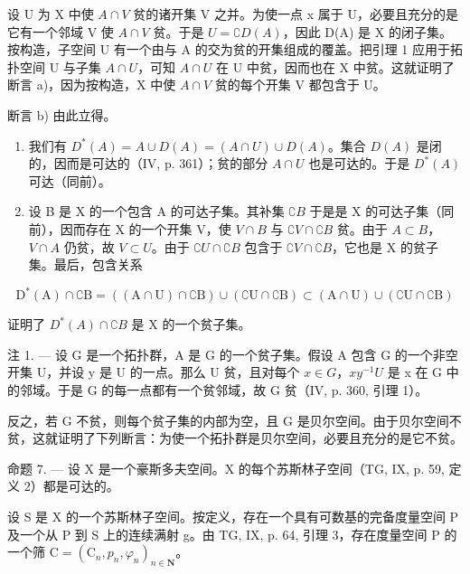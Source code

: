 设 U 为 X 中使 \(A \cap V\) 贫的诸开集 V 之并。为使一点 x 属于 U，必要且充分的是它有一个邻域 V 使 \(A \cap V\) 贫。于是 \(U = \complement D(A)\)，因此 D(A) 是 X 的闭子集。按构造，子空间 U 有一个由与 A 的交为贫的开集组成的覆盖。把引理 1 应用于拓扑空间 U 与子集 \(A \cap U\)，可知 \(A \cap U\) 在 U 中贫，因而也在 X 中贫。这就证明了断言 a)，因为按构造，X 中使 \(A \cap V\) 贫的每个开集 V 都包含于 U。

断言 b) 由此立得。

\begin{enumerate}
\def\labelenumi{\alph{enumi})}
\setcounter{enumi}{2}
\item
  我们有 \(D^{*}(A) = A \cup D(A) = (A \cap U) \cup D(A)\)。集合 \(D(A)\) 是闭的，因而是可达的（IV, p. 361）；贫的部分 \(A \cap U\) 也是可达的。于是 \(D^{*}(A)\) 可达（同前）。
\item
  设 B 是 X 的一个包含 A 的可达子集。其补集 \(\complement B\) 于是是 X 的可达子集（同前），因而存在 X 的一个开集 V，使 \(V \cap B\) 与 \(\complement V \cap \complement B\) 贫。由于 \(A \subset B\)，\(V \cap A\) 仍贫，故 \(V \subset U\)。由于 \(\complement U \cap \complement B\) 包含于 \(\complement V \cap \complement B\)，它也是 X 的贫子集。最后，包含关系
\end{enumerate}

\[
\mathrm{D} ^ {*} (\mathrm{A}) \cap \complement \mathrm{B} = ((\mathrm{A} \cap \mathrm{U}) \cap \complement \mathrm{B}) \cup (\complement \mathrm{U} \cap \complement \mathrm{B}) \subset (\mathrm{A} \cap \mathrm{U}) \cup (\complement \mathrm{U} \cap \complement \mathrm{B})
\]

证明了 \(D^{*}(A) \cap \complement B\) 是 X 的一个贫子集。

注 1. --- 设 G 是一个拓扑群，A 是 G 的一个贫子集。假设 A 包含 G 的一个非空开集 U，并设 y 是 U 的一点。那么 U 贫，且对每个 \(x \in G\)，\(xy^{-1}U\) 是 x 在 G 中的邻域。于是 G 的每一点都有一个贫邻域，故 G 贫（IV, p. 360, 引理 1）。

反之，若 G 不贫，则每个贫子集的内部为空，且 G 是贝尔空间。由于贝尔空间不贫，这就证明了下列断言：为使一个拓扑群是贝尔空间，必要且充分的是它不贫。

命题 7. --- 设 X 是一个豪斯多夫空间。X 的每个苏斯林子空间（TG, IX, p. 59, 定义 2）都是可达的。

设 S 是 X 的一个苏斯林子空间。按定义，存在一个具有可数基的完备度量空间 P 及一个从 P 到 S 上的连续满射 g。由 TG, IX, p. 64, 引理 3，存在度量空间 P 的一个筛 \(\mathrm{C} = (\mathrm{C}_{n}, p_{n}, \varphi_{n})_{n \in \mathbf{N}}\)。

